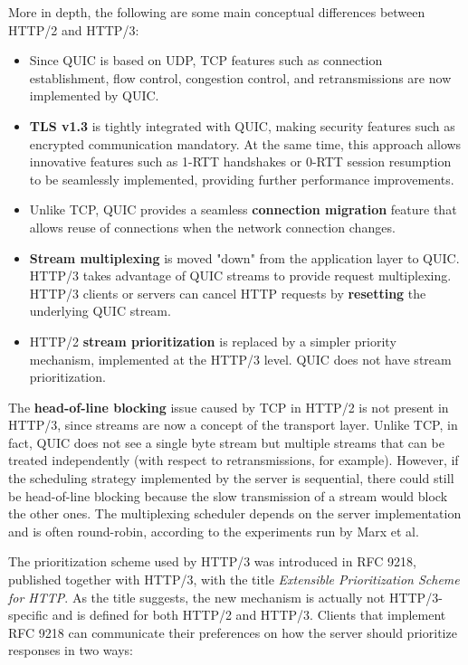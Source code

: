 More in depth, the following are some main conceptual differences between HTTP/2 and HTTP/3:

\begin{itemize}
    \item Since QUIC is based on UDP, TCP features such as connection establishment, flow control, congestion control, and retransmissions are now implemented by QUIC.
    \item \textbf{TLS v1.3} is tightly integrated with QUIC, making security features such as encrypted communication mandatory. At the same time, this approach allows innovative features such as 1-RTT handshakes or 0-RTT session resumption to be seamlessly implemented, providing further performance improvements.
    \item Unlike TCP, QUIC provides a seamless \textbf{connection migration} feature that allows reuse of connections when the network connection changes.
    \item \textbf{Stream multiplexing} is moved "down" from the application layer to QUIC. HTTP/3 takes advantage of QUIC streams to provide request multiplexing. HTTP/3 clients or servers can cancel HTTP requests by \textbf{resetting} the underlying QUIC stream.
    \item HTTP/2 \textbf{stream prioritization} is replaced by a simpler priority mechanism, implemented at the HTTP/3 level. QUIC does not have stream prioritization.
\end{itemize}


The \textbf{head-of-line blocking} issue caused by TCP in HTTP/2 is not present in HTTP/3, since streams are now a concept of the transport layer. Unlike TCP, in fact, QUIC does not see a single byte stream but multiple streams that can be treated independently (with respect to retransmissions, for example). However, if the scheduling strategy implemented by the server is sequential, there could still be head-of-line blocking because the slow transmission of a stream would block the other ones. The multiplexing scheduler depends on the server implementation and is often round-robin, according to the experiments run by Marx et al.\cite{quicdiversity}

The prioritization scheme used by HTTP/3 was introduced in RFC 9218, published together with HTTP/3, with the title \textit{Extensible Prioritization Scheme for HTTP}. As the title suggests, the new mechanism is actually not HTTP/3-specific and is defined for both HTTP/2 and HTTP/3. Clients that implement RFC 9218 can communicate their preferences on how the server should prioritize responses in two ways:\cite{rfc9218}

